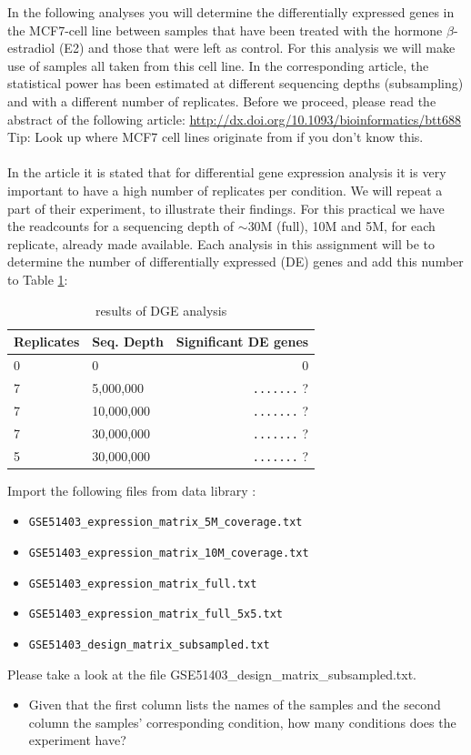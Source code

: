 \documentclass[11pt,a4paper]{article}
\begin{document}
In the following analyses you will determine the differentially expressed genes in the MCF7-cell line between samples that have been treated with the hormone $\beta$-estradiol (E2) and those that were left as control. For this analysis we will make use of samples all taken from this cell line. In the corresponding article, the statistical power has been estimated at different sequencing depths (subsampling) and with a different number of replicates. Before we proceed, please read the abstract of the following article:
\url{http://dx.doi.org/10.1093/bioinformatics/btt688}\\
Tip: Look up where MCF7 cell lines originate from if you don't know this.\\
\\
In the article it is stated that for differential gene expression analysis it is very important to have a high number of replicates per condition. We will repeat a part of their experiment, to illustrate their findings. For this practical we have the readcounts for a sequencing depth of $\sim$30M (full), 10M and 5M, for each replicate, already made available. Each analysis in this assignment
will be to determine the number of differentially expressed (DE) genes and add this number to Table \ref{tab:dge_ad_01}:
\begin{table}[]
\centering
\caption{results of DGE analysis}
\label{tab:dge_ad_01}
\begin{tabular}{ | l | l | r | }
\hline
Replicates & Seq. Depth & Significant DE genes \\
\hline
0          & 0          & 0\quad\quad \\
7          & 5,000,000  & \verb|.......| ? \\
7          & 10,000,000 & \verb|.......| ? \\
7          & 30,000,000 & \verb|.......| ? \\
5          & 30,000,000 & \verb|.......| ? \\
\hline
\end{tabular}
\end{table}
Import the following files from data library \datalibrarydirrnaseqadvanced :
\begin{itemize}
	\item[] \verb|GSE51403_expression_matrix_5M_coverage.txt|
	\item[] \verb|GSE51403_expression_matrix_10M_coverage.txt|
	\item[] \verb|GSE51403_expression_matrix_full.txt|
	\item[] \verb|GSE51403_expression_matrix_full_5x5.txt|
	\item[] \verb|GSE51403_design_matrix_subsampled.txt|
\end{itemize}
Please take a look at the file GSE51403\_design\_matrix\_subsampled.txt.
\begin{itemize}
	\item Given that the first column lists the names of the samples and the second column the samples' corresponding condition, how many conditions does the experiment have?
\end{itemize}
\end{document}
